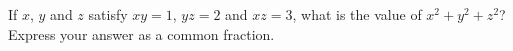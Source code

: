 If $x$, $y$ and $z$ satisfy $xy=1$, $yz=2$ and $xz=3$, what is the value of $x^2+y^2+z^2$? Express your answer as a common fraction.
